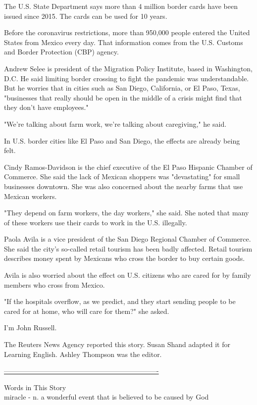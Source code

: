 The U.S. State Department says more than 4 million border cards have been issued since 2015. The cards can be used for 10 years.

Before the coronavirus restrictions, more than 950,000 people entered the United States from Mexico every day. That information comes from the U.S. Customs and Border Protection (CBP) agency.

Andrew Selee is president of the Migration Policy Institute, based in Washington, D.C. He said limiting border crossing to fight the pandemic was understandable. But he worries that in cities such as San Diego, California, or El Paso, Texas, "businesses that really should be open in the middle of a crisis might find that they don't have employees."

"We're talking about farm work, we're talking about caregiving," he said.

In U.S. border cities like El Paso and San Diego, the effects are already being felt.

Cindy Ramos-Davidson is the chief executive of the El Paso Hispanic Chamber of Commerce. She said the lack of Mexican shoppers was "devastating" for small businesses downtown. She was also concerned about the nearby farms that use Mexican workers.

"They depend on farm workers, the day workers," she said. She noted that many of these workers use their cards to work in the U.S. illegally.

Paola Avila is a vice president of the San Diego Regional Chamber of Commerce. She said the city's so-called retail tourism has been badly affected. Retail tourism describes money spent by Mexicans who cross the border to buy certain goods.

Avila is also worried about the effect on U.S. citizens who are cared for by family members who cross from Mexico.

"If the hospitals overflow, as we predict, and they start sending people to be cared for at home, who will care for them?" she asked.

I'm John Russell.

The Reuters News Agency reported this story. Susan Shand adapted it for Learning English. Ashley Thompson was the editor.


\underline{-------------------------------------------------------------------}

Words in This Story \\
miracle - n. a wonderful event that is believed to be caused by God \\

